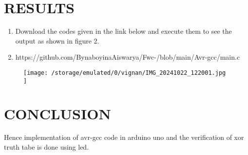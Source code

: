 \documentclass[conference]{IEEEtran}
\begin{document}
\section{RESULTS}
 \begin{enumerate}
\item Download the codes given in the link below and execute them to see the output as shown in figure 2.
\item https://github.com/BynaboyinaAiswarya/Fwc-/blob/main/Avr-gcc/main.c
 \end{enumerate}


 \begin{figure}[h]                           
\centering                                 
\texttt{[image:   /storage/emulated/0/vignan/IMG\_20241022\_122001.jpg    ]}                                           
\caption{\label{fig-2:Gates}}               
\end{figure}
\section{CONCLUSION}
Hence implementation of avr-gcc code in arduino uno and the verification of xor truth tabe is done using led.
\end{document}
